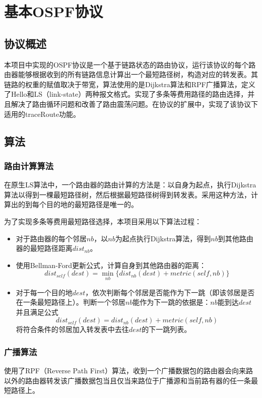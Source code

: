 \section{基本OSPF协议} %
\label{sec:ospf}
	\subsection{协议概述} %
	\label{sub:协议概述}
		本项目中实现的OSPF协议是一个基于链路状态的路由协议，运行该协议的每个路由器能够根据收到的所有链路信息计算出一个最短路径树，构造对应的转发表。其链路的权重的赋值取决于带宽，算法使用的是Dijkstra算法和RPF广播算法，定义了Hello和LS（link-state）两种报文格式。实现了多条等费用路径的路由选择，并且解决了路由循环问题和改善了路由震荡问题。在协议的扩展中，实现了该协议下适用的traceRoute功能。
	\subsection{算法} %
	\label{sub:算法}
		\subsubsection{路由计算算法} %
		\label{ssub:路由计算算法}
			在原生LS算法中，一个路由器的路由计算的方法是：以自身为起点，执行Dijkstra算法以得到一棵最短路径树，然后根据最短路径树得到转发表。采用这种方法，计算出的到每个目的地的最短路径是唯一的。
			\par 为了实现多条等费用最短路径选择，本项目采用以下算法过程：
			\begin{itemize}
				\item 对于路由器的每个邻居$nb$，以$nb$为起点执行Dijkstra算法，得到$nb$到其他路由器的最短路径距离$dist_{nb}$。
				\item 使用Bellman-Ford更新公式，计算自身到其他路由器的距离：$$dist_{self}(dest) = \min_{nb}\{dist_{nb}(dest) + metric(self,nb)\} $$
				\item 对于每一个目的地$dest$，依次判断每个邻居是否能作为下一跳（即该邻居是否在一条最短路径上）。判断一个邻居$nb$能作为下一跳的依据是：$nb$能到达$dest$并且满足公式$$dist_{self}(dest) = dist_{nb}(dest) + metric(self,nb)$$将符合条件的邻居加入转发表中去往$dest$的下一跳列表。
			\end{itemize}		
		\subsubsection{广播算法} %
		\label{ssub:广播算法}
			使用了RPF（Reverse Path First）算法，收到一个广播数据包的路由器会向来路以外的路由器转发该广播数据包当且仅当来路位于广播源和当前路有器的任一条最短路径上。
